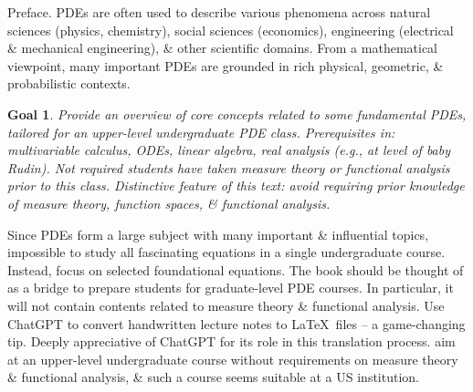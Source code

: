 \documentclass{article}
\newtheorem{goal}{Goal}
\begin{document}
\begin{enumerate}
	{\sf Preface.} PDEs are often used to describe various phenomena across natural sciences (physics, chemistry), social sciences (economics), engineering (electrical \& mechanical engineering), \& other scientific domains. From a mathematical viewpoint, many important PDEs are grounded in rich physical, geometric, \& probabilistic contexts.
	\begin{goal}
		Provide an overview of core concepts related to some fundamental PDEs, tailored for an upper-level undergraduate PDE class. Prerequisites in: multivariable calculus, ODEs, linear algebra, real analysis (e.g., at level of baby Rudin). Not required students have taken measure theory or functional analysis prior to this class. Distinctive feature of this text: avoid requiring prior knowledge of measure theory, function spaces, \& functional analysis.
	\end{goal}	
	Since PDEs form a large subject with many important \& influential topics, impossible to study all fascinating equations in a single undergraduate course. Instead, focus on selected foundational equations. The book should be thought of as a bridge to prepare students for graduate-level PDE courses. In particular, it will not contain contents related to measure theory \& functional analysis. Use ChatGPT to convert handwritten lecture notes to \LaTeX\ files -- a game-changing tip. Deeply appreciative of ChatGPT for its role in this translation process. aim at an upper-level undergraduate course without requirements on measure theory \& functional analysis, \& such a course seems suitable at a US institution.
	

\end{enumerate}
\end{document}
